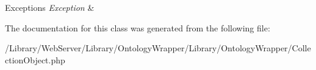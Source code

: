 \begin{DoxyExceptions}{Exceptions}
{\em Exception} & \\
\hline
\end{DoxyExceptions}


The documentation for this class was generated from the following file\-:\begin{DoxyCompactItemize}
\item 
/\-Library/\-Web\-Server/\-Library/\-Ontology\-Wrapper/\-Library/\-Ontology\-Wrapper/Collection\-Object.\-php\end{DoxyCompactItemize}
